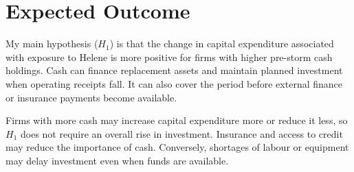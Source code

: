 \section*{Expected Outcome}

My main hypothesis ($H_1$) is that the change in capital expenditure associated with exposure to Helene is more positive for firms with higher pre-storm cash holdings. Cash can finance replacement assets and maintain planned investment when operating receipts fall. It can also cover the period before external finance or insurance payments become available.

Firms with more cash may increase capital expenditure more or reduce it less, so $H_1$ does not require an overall rise in investment. Insurance and access to credit may reduce the importance of cash. Conversely, shortages of labour or equipment may delay investment even when funds are available.
